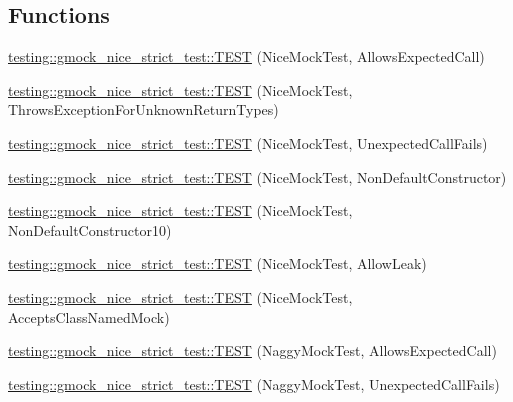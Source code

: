 \subsection*{Functions}
\begin{DoxyCompactItemize}
\item 
\mbox{\hyperlink{namespacetesting_1_1gmock__nice__strict__test_a12b9f686345faa5a646da65a67c38a44}{testing\+::gmock\+\_\+nice\+\_\+strict\+\_\+test\+::\+T\+E\+ST}} (Nice\+Mock\+Test, Allows\+Expected\+Call)
\item 
\mbox{\hyperlink{namespacetesting_1_1gmock__nice__strict__test_af6a34a561886bec5e278239ef65d6011}{testing\+::gmock\+\_\+nice\+\_\+strict\+\_\+test\+::\+T\+E\+ST}} (Nice\+Mock\+Test, Throws\+Exception\+For\+Unknown\+Return\+Types)
\item 
\mbox{\hyperlink{namespacetesting_1_1gmock__nice__strict__test_a2bad58b3a12ea95eb4a731026c576b40}{testing\+::gmock\+\_\+nice\+\_\+strict\+\_\+test\+::\+T\+E\+ST}} (Nice\+Mock\+Test, Unexpected\+Call\+Fails)
\item 
\mbox{\hyperlink{namespacetesting_1_1gmock__nice__strict__test_a4172e1193c21d61e34d9b2c379d2f6be}{testing\+::gmock\+\_\+nice\+\_\+strict\+\_\+test\+::\+T\+E\+ST}} (Nice\+Mock\+Test, Non\+Default\+Constructor)
\item 
\mbox{\hyperlink{namespacetesting_1_1gmock__nice__strict__test_a81bfeea94824935648545225f5dd3c00}{testing\+::gmock\+\_\+nice\+\_\+strict\+\_\+test\+::\+T\+E\+ST}} (Nice\+Mock\+Test, Non\+Default\+Constructor10)
\item 
\mbox{\hyperlink{namespacetesting_1_1gmock__nice__strict__test_a49fd5610815a7ced633a1c8ac3f62709}{testing\+::gmock\+\_\+nice\+\_\+strict\+\_\+test\+::\+T\+E\+ST}} (Nice\+Mock\+Test, Allow\+Leak)
\item 
\mbox{\hyperlink{namespacetesting_1_1gmock__nice__strict__test_a0a43059a52437e547c8fb836008b8e60}{testing\+::gmock\+\_\+nice\+\_\+strict\+\_\+test\+::\+T\+E\+ST}} (Nice\+Mock\+Test, Accepts\+Class\+Named\+Mock)
\item 
\mbox{\hyperlink{namespacetesting_1_1gmock__nice__strict__test_a8ae416186af77fc0d066467be92c6c86}{testing\+::gmock\+\_\+nice\+\_\+strict\+\_\+test\+::\+T\+E\+ST}} (Naggy\+Mock\+Test, Allows\+Expected\+Call)
\item 
\mbox{\hyperlink{namespacetesting_1_1gmock__nice__strict__test_a475ee57b7b86f3f81d50819db3dd78b4}{testing\+::gmock\+\_\+nice\+\_\+strict\+\_\+test\+::\+T\+E\+ST}} (Naggy\+Mock\+Test, Unexpected\+Call\+Fails)
\item 

\end{DoxyCompactItemize}
